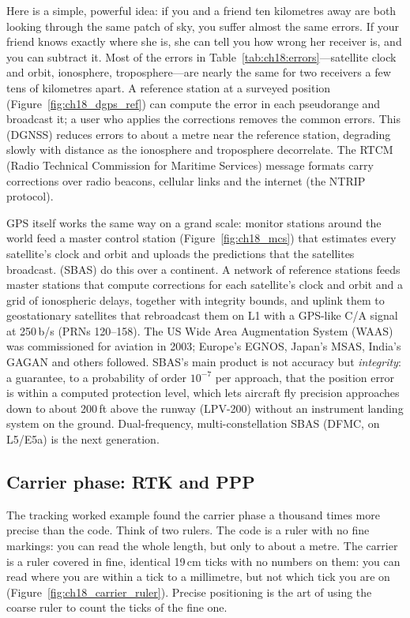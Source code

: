 Here is a simple, powerful idea: if you and a friend ten kilometres away are both looking through
the same patch of sky, you suffer almost the same errors. If your friend knows exactly where she
is, she can tell you how wrong her receiver is, and you can subtract it. Most of the errors in
Table~\ref{tab:ch18:errors}---satellite clock and orbit, ionosphere, troposphere---are nearly the
same for two receivers a few tens of kilometres apart. A reference station at a surveyed position
(Figure~\ref{fig:ch18_dgps_ref}) can compute the error in each pseudorange and broadcast it; a
user who applies the corrections removes the common errors. This 
(DGNSS) reduces errors to about a metre near the reference station, degrading slowly with
distance as the ionosphere and troposphere decorrelate. The RTCM (Radio Technical Commission for
Maritime Services) message formats carry corrections over radio beacons, cellular links and the
internet (the NTRIP protocol).

GPS itself works the same way on a grand scale: monitor stations around the world feed a master
control station (Figure~\ref{fig:ch18_mcs}) that estimates every satellite's clock and orbit and
uploads the predictions that the satellites broadcast.  (SBAS) do this over a continent. A network of
reference stations feeds master stations that compute corrections for each satellite's clock and
orbit and a grid of ionospheric delays, together with integrity bounds, and uplink them to
geostationary satellites that rebroadcast them on L1 with a GPS-like C/A signal at 250\,b/s
(PRNs 120--158). The US Wide Area Augmentation System (WAAS) was commissioned for aviation in
2003; Europe's EGNOS, Japan's MSAS, India's GAGAN and others followed. SBAS's main product is
not accuracy but \emph{integrity}: a guarantee, to a probability of order $10^{-7}$ per approach,
that the position error is within a computed protection level, which lets aircraft fly
precision approaches down to about 200\,ft above the runway (LPV-200) without an instrument
landing system on the ground. Dual-frequency, multi-constellation SBAS (DFMC, on L5/E5a) is the
next generation.

\subsection{Carrier phase: RTK and PPP}
\label{sec:ch18:rtk}

The tracking worked example found the carrier phase a thousand times more precise than the code.
Think of two rulers. The code is a ruler with no fine markings: you can read the whole length,
but only to about a metre. The carrier is a ruler covered in fine, identical 19\,cm ticks with no
numbers on them: you can read where you are within a tick to a millimetre, but not which tick you
are on (Figure~\ref{fig:ch18_carrier_ruler}). Precise positioning is the art of using the coarse
ruler to count the ticks of the fine one.

